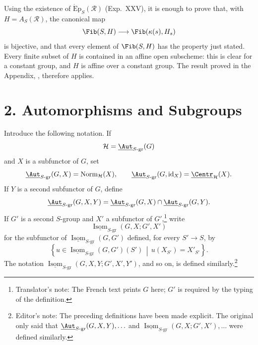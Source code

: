 Using the existence of \(\operatorname{\acute{E}p}_S(\mathscr R)\)
(Exp.~XXV), it is enough to prove that, with
\(H=A_S(\mathscr R)\), the canonical map
\[
  \Fib(S,H)\longrightarrow\Fib(\kappa(s),H_s)
\]
is bijective, and that every element of \(\Fib(S,H)\) has the property
just stated. Every finite subset of \(H\) is contained in an affine
open subscheme: this is clear for a constant group, and \(H\) is
affine over a constant group. The result proved in the Appendix,
, therefore applies.

\section*{2. Automorphisms and Subgroups}

Introduce the following notation. If
\[
  \mathcal H=\underline{\Aut}_{S\text{-}\mathrm{gr}}(G)
\]
and \(X\) is a subfunctor of \(G\), set
\[
  \underline{\Aut}_{S\text{-}\mathrm{gr}}(G,X)
  =\operatorname{Norm}_{\mathcal H}(X),
  \qquad
  \underline{\Aut}_{S\text{-}\mathrm{gr}}(G,\operatorname{id}_X)
  =\underline{\Centr}_{\mathcal H}(X).
\]
If \(Y\) is a second subfunctor of \(G\), define
\[
  \underline{\Aut}_{S\text{-}\mathrm{gr}}(G,X,Y)
  =
  \underline{\Aut}_{S\text{-}\mathrm{gr}}(G,X)
  \cap
  \underline{\Aut}_{S\text{-}\mathrm{gr}}(G,Y).
\]
If \(G'\) is a second \(S\)-group and \(X'\) a subfunctor of \(G'\),\footnote{Translator's note: The French text prints \(G\) here; \(G'\) is required by the typing of the definition.}
write
\[
  \underline{\operatorname{Isom}}_{S\text{-}\mathrm{gr}}
    (G,X;G',X')
\]
for the subfunctor of
\(\underline{\operatorname{Isom}}_{S\text{-}\mathrm{gr}}(G,G')\)
defined, for every \(S'\to S\), by
\[
  \left\{
    u\in
    \underline{\operatorname{Isom}}_{S\text{-}\mathrm{gr}}(G,G')(S')
    \,\middle|\,
    u(X_{S'})=X'_{S'}
  \right\}.
\]
The notation
\(\underline{\operatorname{Isom}}_{S\text{-}\mathrm{gr}}
(G,X,Y;G',X',Y')\), and so on, is defined similarly.\footnote{Editor's
note: The preceding definitions have been made explicit. The original
only said that
\(\underline{\Aut}_{S\text{-}\mathrm{gr}}(G,X,Y),\ldots\) and
\(\underline{\operatorname{Isom}}_{S\text{-}\mathrm{gr}}
(G,X;G',X'),\ldots\) were defined similarly.}

